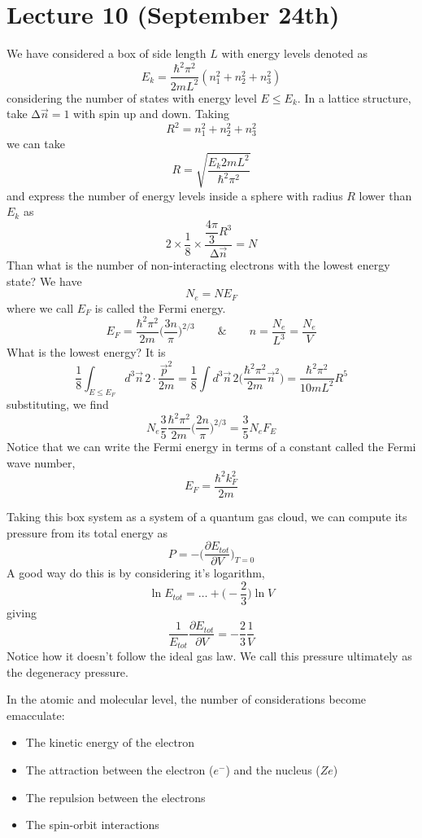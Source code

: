 \section{Lecture 10 (September 24th)}
\begin{recall}
We have considered a box of side length $L$ with energy levels denoted as
\[E_{k}=\dfrac{\hbar ^2\pi ^2}{2mL^2}(n_1^2+n_2^2+n_3^2)\]
considering the number of states with energy level $E\leq E_{k}$. In a lattice structure, take $\mathrm{\Delta }\vec{n}=1$ with spin up and down. Taking 
\[R^2=n_1^2+n_2^2+n_3^2\]
we can take
\[R=\sqrt{\dfrac{E_{k}2mL^2}{\hbar ^2\pi ^2}}\]
and express the number of energy levels inside a sphere with radius $R$ lower than $E_{k}$ as
\[2\times \dfrac{1}{8}\times \dfrac{\dfrac{4\pi }{3}R^3}{\mathrm{\Delta }\vec{n}}=N\]
Than what is the number of non-interacting electrons with the lowest energy state? We have
\[N_{e}=NE_{F}\]
where we call $E_{F}$ is called the Fermi energy. 
\[E_{F}=\dfrac{\hbar ^2\pi ^2}{2m}\Big(\dfrac{3n}{\pi }\Big)^{2/3}\qquad\&\qquad n=\dfrac{N_{e}}{L^3}=\dfrac{N_{e}}{V}\]
What is the lowest energy? It is
\[\dfrac{1}{8}\int _{E\leq E_{F}}d^3\vec{n}\,2\cdot \dfrac{\vec{p}^2}{2m}=\dfrac{1}{8}\int d^3\vec{n}\,2\Big(\dfrac{\hbar ^2\pi ^2}{2m}\vec{n}^2\Big)=\dfrac{\hbar ^2\pi ^2}{10mL^2}R^{5}\]
substituting, we find
\[N_{e}\dfrac{3}{5}\dfrac{\hbar ^2\pi ^2}{2m}\Big(\dfrac{2n}{\pi }\Big)^{2/3}=\dfrac{3}{5}N_{e}F_{E}\]
Notice that we can write the Fermi energy in terms of a constant called the Fermi wave number,
\[E_{F}=\dfrac{\hbar ^2k_{F}^2}{2m}\]
\end{recall}
\vspace{2ex}
\begin{thm}
Taking this box system as a system of a quantum gas cloud, we can compute its pressure from its total energy as
\[P=-\Big(\dfrac{\partial E_{tot}}{\partial V} \Big)_{T=0}\]
A good way do this is by considering it's logarithm,
\[\ln E_{tot}=\ldots +\Big(-\dfrac{2}{3}\Big)\ln V\]
giving
\[\dfrac{1}{E_{tot}}\dfrac{\partial E_{tot}}{\partial V}=-\dfrac{2}{3}\dfrac{1}{V} \]
Notice how it doesn't follow the ideal gas law. We call this pressure ultimately as the degeneracy pressure. 
\end{thm}
\vspace{2ex}
\begin{rmk}
In the atomic and molecular level, the number of considerations become emacculate:
\begin{itemize}
\item[(i)] The kinetic energy of the electron
\item[(ii)] The attraction between the electron ($e^{-}$) and the nucleus ($Ze$)
\item[(iii)] The repulsion between the electrons 
\item[(iv)] The spin-orbit interactions 
\end{itemize}
\end{rmk}
